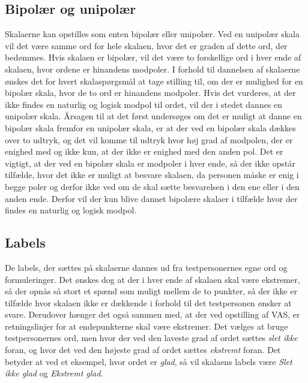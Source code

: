 \subsection{Bipolær og unipolær}
Skalaerne kan opstilles som enten bipolær eller unipolær. Ved en unipolær skala vil det være samme ord for hele skalaen, hvor det er graden af dette ord, der bedømmes. Hvis skalaen er bipolær, vil det være to forskellige ord i hver ende af skalaen, hvor ordene er hinandens modpoler. \blankline
%
I forhold til dannelsen af skalaerne ønskes det for hvert skalaspørgsmål at tage stilling til, om der er mulighed for en bipolær skala, hvor de to ord er hinandens modpoler. Hvis det vurderes, at der ikke findes en naturlig og logisk modpol til ordet, vil der i stedet dannes en unipolær skala. \blankline
%
Årsagen til at det først undersøges om det er muligt at danne en bipolær skala fremfor en unipolær skala, er at der ved en bipolær skala dækkes over to udtryk, og det vil komme til udtryk hvor høj grad af modpolen, der er enighed med og ikke kun, at der ikke er enighed med den anden pol. Det er vigtigt, at der ved en bipolær skala er modpoler i hver ende, så der ikke opstår tilfælde, hvor det ikke er muligt at besvare skalaen, da personen måske er enig i begge poler og derfor ikke ved om de skal sætte besvarelsen i den ene eller i den anden ende. Derfor vil der kun blive dannet bipolære skalaer i tilfælde hvor der findes en naturlig og logisk modpol. 
%
\subsection{Labels}
%
De labels, der sættes på skalaerne dannes ud fra testpersonernes egne ord og formuleringer. 
Det ønskes dog at der i hver ende af skalaen skal være ekstremer, så der opnås så stort et spænd som muligt mellem de to punkter, så der ikke er tilfælde hvor skalaen ikke er dækkende i forhold til det testpersonen ønsker at svare. Derudover hænger det også sammen med, at der ved opstilling af VAS, er retningslinjer for at endepunkterne skal være ekstremer.\blankline
%
Det vælges at bruge testpersonernes ord, men hvor der ved den laveste grad af ordet sættes \textit{slet ikke} foran, og hvor det ved den højeste grad af ordet sættes \textit{ekstremt} foran. Det betyder at ved et eksempel, hvor ordet er \textit{glad}, så vil skalaens labels være \textit{Slet ikke glad} og \textit{Ekstremt glad}.


